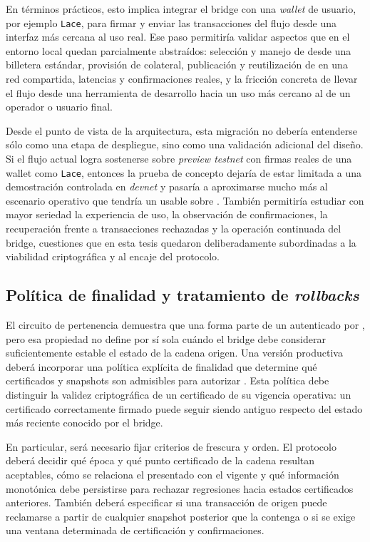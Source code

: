 En términos prácticos, esto implica integrar el bridge con una \textit{wallet} de usuario, por ejemplo \texttt{Lace}, para firmar y enviar las transacciones del flujo desde una interfaz más cercana al uso real. Ese paso permitiría validar aspectos que en el entorno local quedan parcialmente abstraídos: selección y manejo de \UTxOs desde una billetera estándar, provisión de colateral, publicación y reutilización de \ReferenceScripts en una red compartida, latencias y confirmaciones reales, y la fricción concreta de llevar el flujo desde una herramienta de desarrollo hacia un uso más cercano al de un operador o usuario final.

Desde el punto de vista de la arquitectura, esta migración no debería entenderse sólo como una etapa de despliegue, sino como una validación adicional del diseño. Si el flujo actual logra sostenerse sobre \textit{preview testnet} con firmas reales de una wallet como \texttt{Lace}, entonces la prueba de concepto dejaría de estar limitada a una demostración controlada en \textit{devnet} y pasaría a aproximarse mucho más al escenario operativo que tendría un \zkBridge usable sobre \Cardano. También permitiría estudiar con mayor seriedad la experiencia de uso, la observación de confirmaciones, la recuperación frente a transacciones rechazadas y la operación continuada del bridge, cuestiones que en esta tesis quedaron deliberadamente subordinadas a la viabilidad criptográfica y al encaje \Onchain del protocolo.

\subsection{Política de finalidad y tratamiento de \textit{rollbacks}}
\label{subsec:conclusions-and-future-work-finalidad-y-rollbacks}

El circuito de pertenencia demuestra que una \LockTx forma parte de un \TransactionSnapshot autenticado por \Mithril, pero esa propiedad no define por sí sola cuándo el bridge debe considerar suficientemente estable el estado de la cadena origen. Una versión productiva deberá incorporar una política explícita de finalidad que determine qué certificados y snapshots son admisibles para autorizar \MintTx. Esta política debe distinguir la validez criptográfica de un certificado de su vigencia operativa: un certificado correctamente firmado puede seguir siendo antiguo respecto del estado más reciente conocido por el bridge.

En particular, será necesario fijar criterios de frescura y orden. El protocolo deberá decidir qué época y qué punto certificado de la cadena resultan aceptables, cómo se relaciona el \TransactionSnapshot presentado con el \StakeDistributionUTxO vigente y qué información monotónica debe persistirse para rechazar regresiones hacia estados certificados anteriores. También deberá especificar si una transacción de origen puede reclamarse a partir de cualquier snapshot posterior que la contenga o si se exige una ventana determinada de certificación y confirmaciones.

